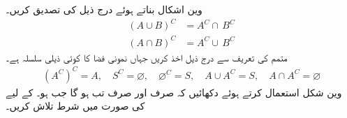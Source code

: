وین اشکال بناتے ہوئے درج ذیل  کی تصدیق کریں۔
\begin{align*}
(A\cup B)^C&=A^C\cap \,B^C\\
(A\cap B)^C&=A^C \cup \,B^C
\end{align*}
\quad
متمم کی تعریف سے درج ذیل اخذ کریں جہاں نمونی فضا  کا  کوئی ذیلی سلسلہ ہے۔
\begin{align*}
(A^C)^C=A,\quad S^C=\varnothing,\quad \varnothing^C=S,\quad A\cup A^C=S,\quad A\cap A^C=\varnothing
\end{align*}
\quad
وین شکل استعمال کرتے ہوئے دکھائیں کہ  صرف اور صرف تب ہو گا جب  ہو۔ کے لیے  کی صورت میں شرط تلاش کریں۔

